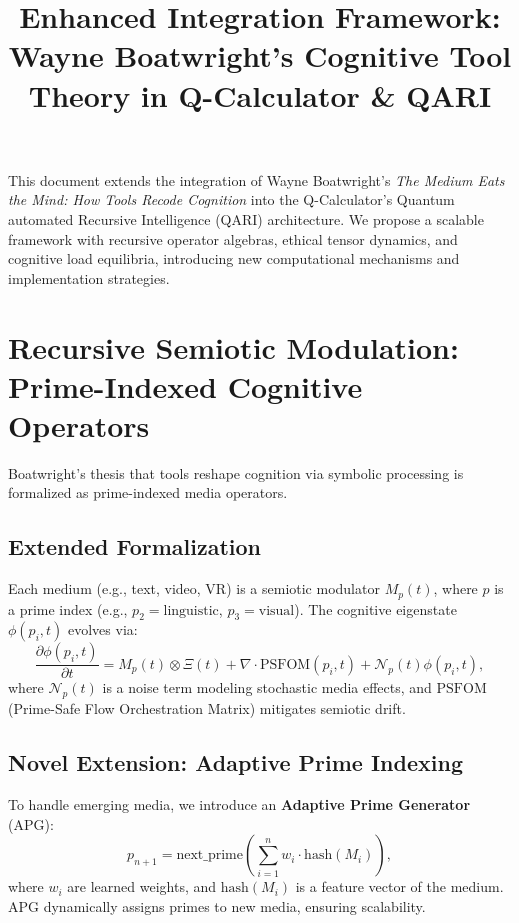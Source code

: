 \documentclass[12pt]{article}
\begin{document}
\newpage
\title{Enhanced Integration Framework: Wayne Boatwright’s Cognitive Tool Theory in Q-Calculator \& QARI}

This document extends the integration of Wayne Boatwright’s \textit{The Medium Eats the Mind: How Tools Recode Cognition} into the Q-Calculator’s Quantum automated Recursive Intelligence (QARI) architecture. We propose a scalable framework with recursive operator algebras, ethical tensor dynamics, and cognitive load equilibria, introducing new computational mechanisms and implementation strategies.

\section{Recursive Semiotic Modulation: Prime-Indexed Cognitive Operators}
Boatwright’s thesis that tools reshape cognition via symbolic processing is formalized as prime-indexed media operators.

\subsection{Extended Formalization}
Each medium (e.g., text, video, VR) is a semiotic modulator $M_p(t)$, where $p$ is a prime index (e.g., $p_2 = \text{linguistic}$, $p_3 = \text{visual}$). The cognitive eigenstate $\phi(p_i, t)$ evolves via:
\[
\frac{\partial \phi(p_i, t)}{\partial t} = M_p(t) \otimes \Xi(t) + \nabla \cdot \text{PSFOM}(p_i, t) + \mathcal{N}_p(t) \phi(p_i, t),
\]
where $\mathcal{N}_p(t)$ is a noise term modeling stochastic media effects, and $\text{PSFOM}$ (Prime-Safe Flow Orchestration Matrix) mitigates semiotic drift.

\subsection{Novel Extension: Adaptive Prime Indexing}
To handle emerging media, we introduce an \textbf{Adaptive Prime Generator} (APG):
\[
p_{n+1} = \text{next_prime} \left( \sum_{i=1}^n w_i \cdot \text{hash}(M_i) \right),
\]
where $w_i$ are learned weights, and $\text{hash}(M_i)$ is a feature vector of the medium. APG dynamically assigns primes to new media, ensuring scalability.
\end{document}
